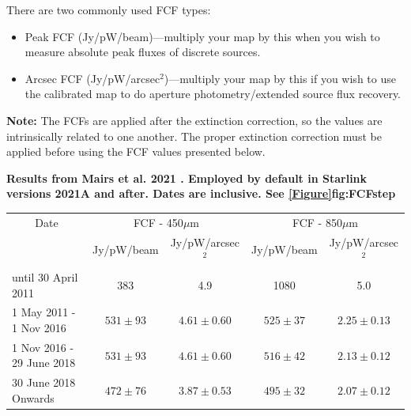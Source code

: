 \vspace{5mm}

There are two commonly used FCF types:
\begin{itemize}
\item Peak FCF (Jy/pW/beam)---multiply your map by this when you wish
to measure absolute peak fluxes of discrete sources.
\item Arcsec FCF (Jy/pW/arcsec$^2$)---multiply your map by this if
you wish to use the calibrated map to do aperture photometry/extended source flux recovery.
\end{itemize}

\textbf{Note:} The FCFs are applied after the extinction correction, so the values are intrinsically
related to one another. The proper extinction correction must be applied before using the FCF
values presented below.

\newpage

\textbf{Results from Mairs et al. 2021 \cite{mairs21}. Employed by
default in Starlink versions 2021A and after. Dates are inclusive. See
\cref{Figure}{fig:FCFstep}{}}\\
\begin{table}[h!]
\begin{center}
\begin{tabular}{|l|c|c|c|c|}
 \hline
 \multicolumn{1}{|c|}{Date} &
 \multicolumn{2}{c|}{FCF - 450$\mu$m} &
 \multicolumn{2}{c|}{FCF - 850$\mu$m} \\
\cline{2-5}
& Jy/pW/beam &Jy/pW/arcsec$^2$ & Jy/pW/beam &Jy/pW/arcsec$^2$ \\
 \hline
until 30 April 2011 &383  & 4.9 &1080 &5.0 \\
1 May 2011 - 1 Nov 2016 & $531\pm93$ & $4.61\pm0.60$ & $525\pm37$ & $2.25\pm0.13$ \\
1 Nov 2016 - 29 June 2018 & $531\pm93$ & $4.61\pm0.60$ & $516\pm42$ & $2.13\pm0.12$ \\
30 June 2018 Onwards & $472\pm76$ & $3.87\pm0.53$ & $495\pm32$ & $2.07\pm0.12$ 
 \\
\hline
\end{tabular}
\end{center}
\end{table}

